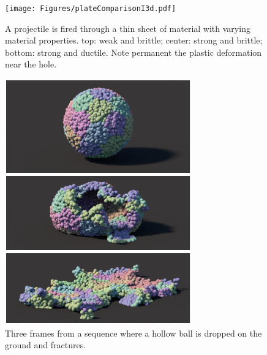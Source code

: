 \documentclass[conference]{acmsiggraph}
\begin{document}


\begin{figure}[h!]
\texttt{[image: Figures/plateComparisonI3d.pdf]}
\caption{A projectile is fired through a thin sheet of material with varying material properties. top: weak and brittle; center: strong and brittle; bottom: strong and ductile.  Note permanent the plastic deformation near the hole.  }
\label{fig:projectile}
\end{figure}

\begin{figure}[h!]
\includegraphics[width=\linewidth]{Figures/fracturedball.pdf}
\caption{Three frames from a sequence where a hollow ball is dropped on the ground and fractures.  }
\label{fig:hollowball}
\end{figure}
\end{document}
